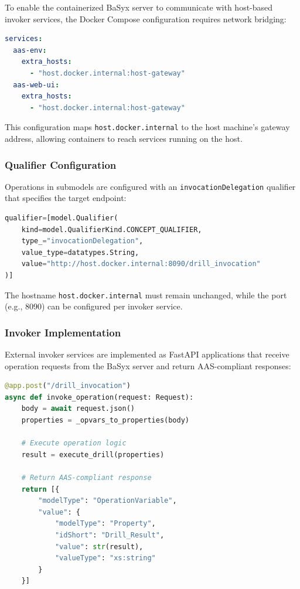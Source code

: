 To enable the containerized BaSyx server to communicate with host-based invoker services, the Docker Compose configuration requires network bridging:

\begin{lstlisting}[language=yaml, caption={Docker Compose Network Configuration}, label={lst:docker_network}]
services:
  aas-env:
    extra_hosts:
      - "host.docker.internal:host-gateway"
  aas-web-ui:
    extra_hosts:
      - "host.docker.internal:host-gateway"
\end{lstlisting}

This configuration maps \texttt{host.docker.internal} to the host machine's gateway address, allowing containers to reach services running on the host.

\subsubsection{Qualifier Configuration}

Operations in submodels are configured with an \texttt{invocationDelegation} qualifier that specifies the target endpoint:

\begin{lstlisting}[language=Python, caption={Operation Invocation Delegation Qualifier}, label={lst:qualifier}]
qualifier=[model.Qualifier(
    kind=model.QualifierKind.CONCEPT_QUALIFIER,
    type_="invocationDelegation",
    value_type=datatypes.String,
    value="http://host.docker.internal:8090/drill_invocation"
)]
\end{lstlisting}

The hostname \texttt{host.docker.internal} must remain unchanged, while the port (e.g., 8090) can be configured per invoker service.

\subsubsection{Invoker Implementation}

External invoker services are implemented as FastAPI applications that receive operation requests from the BaSyx server and return \ac{AAS}-compliant responses:

\begin{lstlisting}[language=Python, caption={Operation Invoker Endpoint Structure}, label={lst:invoker}]
@app.post("/drill_invocation")
async def invoke_operation(request: Request):
    body = await request.json()
    properties = _opvars_to_properties(body)
    
    # Execute operation logic
    result = execute_drill(properties)
    
    # Return AAS-compliant response
    return [{
        "modelType": "OperationVariable",
        "value": {
            "modelType": "Property",
            "idShort": "Drill_Result",
            "value": str(result),
            "valueType": "xs:string"
        }
    }]
\end{lstlisting}


